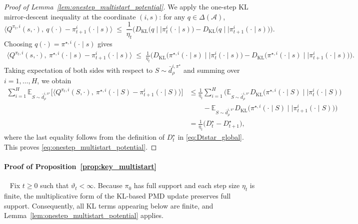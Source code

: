 \documentclass[11pt]{article}
\begin{document}
\begin{proof}[Proof of Lemma~\ref{lem:onestep_multistart_potential}]
We apply the one-step KL mirror-descent inequality \citep[see, e.g.,][]{lan2023policy,xiao2022convergence} at the coordinate $(i,s)$: for any $q\in\Delta(\mathcal A)$,
\begin{equation}
\label{eq:use_onestep}
\big\langle Q^{\pi_t,i}(s,\cdot),\ q(\cdot)-\pi_{t+1}^i(\cdot\mid s)\big\rangle
\;\le\;
\frac{1}{\eta_t}
\Big(
D_{\mathrm{KL}}\!\big(q\mid\mid\pi_t^i(\cdot\mid s)\big)
-
D_{\mathrm{KL}}\!\big(q\mid\mid\pi_{t+1}^i(\cdot\mid s)\big)
\Big).
\end{equation}
Choosing $q(\cdot)=\pi^{\star,i}(\cdot\mid s)$ gives
\begin{align}
\label{eq:use_q_star}
\big\langle Q^{\pi_t,i}(s,\cdot),\ \pi^{\star,i}(\cdot\mid s)-\pi_{t+1}^i(\cdot\mid s)\big\rangle
\;\le\;
\frac{1}{\eta_t}
\Big(
D_{\mathrm{KL}}\!\big(\pi^{\star,i}(\cdot\mid s)\mid\mid\pi_t^i(\cdot\mid s)\big)
-
D_{\mathrm{KL}}\!\big(\pi^{\star,i}(\cdot\mid s)\mid\mid\pi_{t+1}^i(\cdot\mid s)\big)
\Big).
\end{align}
Taking expectation of both sides with respect to $S\sim\bar d^{i,\pi^\star}_\rho$ and summing over
$i=1,\ldots,H$, we obtain
\begin{align*}
\sum_{i=1}^H
\mathbb E_{S\sim \bar d^{i,\pi^\star}_\rho}
\Big[
\big\langle Q^{\pi_t,i}(S,\cdot),\ \pi^{\star,i}(\cdot\mid S)-\pi_{t+1}^i(\cdot\mid S)\big\rangle
\Big]
&\le
\frac{1}{\eta_t}
\sum_{i=1}^H
\Big(
\mathbb E_{S\sim \bar d^{i,\pi^\star}_\rho}
D_{\mathrm{KL}}\!\big(\pi^{\star,i}(\cdot\mid S)\mid\mid\pi_t^i(\cdot\mid S)\big) \\
&\quad\quad -
\mathbb E_{S\sim \bar d^{i,\pi^\star}_\rho}
D_{\mathrm{KL}}\!\big(\pi^{\star,i}(\cdot\mid S)\mid\mid\pi_{t+1}^i(\cdot\mid S)\big)
\Big) \\
&=
\frac{1}{\eta_t}\big(D_t^\star-D_{t+1}^\star\big),
\end{align*}
where the last equality follows from the definition of $D_t^\star$ in \eqref{eq:Dtstar_global}.
This proves \eqref{eq:onestep_multistart_potential}.
\end{proof}

\paragraph{Proof of Proposition~\ref{prop:key_multistart}}~\newline
Fix $t\ge0$ such that $\vartheta_t<\infty$. Because $\pi_0$ has full
support and each step size $\eta_t$ is finite, the multiplicative form
of the KL-based PMD update preserves full support. Consequently, all
KL terms appearing below are finite, and
Lemma~\ref{lem:onestep_multistart_potential} applies.
\end{document}
